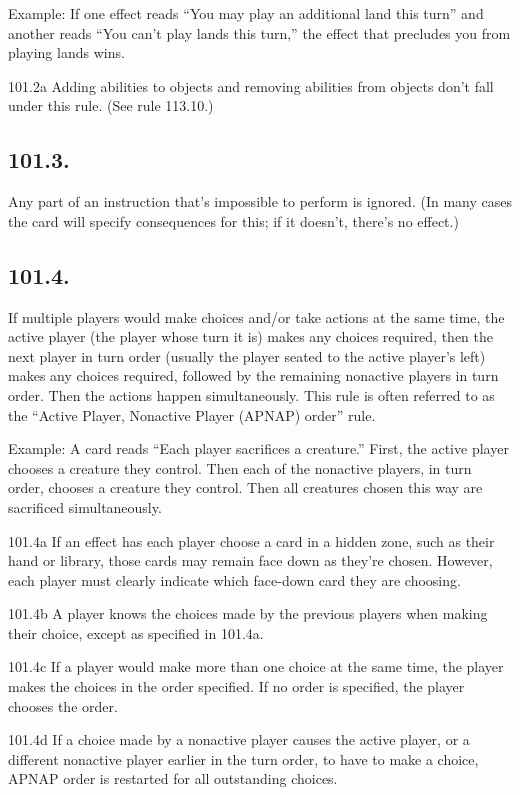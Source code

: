 Example: If one effect reads “You may play an additional land this turn” and another reads “You can’t play lands this turn,” the effect that precludes you from playing lands wins.

101.2a Adding abilities to objects and removing abilities from objects don’t fall under this rule. (See rule 113.10.)

\subsection*{101.3.}
Any part of an instruction that’s impossible to perform is ignored. (In many cases the card will specify consequences for this; if it doesn’t, there’s no effect.)

\subsection*{101.4.}
If multiple players would make choices and/or take actions at the same time, the active player (the player whose turn it is) makes any choices required, then the next player in turn order (usually the player seated to the active player’s left) makes any choices required, followed by the remaining nonactive players in turn order. Then the actions happen simultaneously. This rule is often referred to as the “Active Player, Nonactive Player (APNAP) order” rule.

Example: A card reads “Each player sacrifices a creature.” First, the active player chooses a creature they control. Then each of the nonactive players, in turn order, chooses a creature they control. Then all creatures chosen this way are sacrificed simultaneously.

101.4a If an effect has each player choose a card in a hidden zone, such as their hand or library, those cards may remain face down as they’re chosen. However, each player must clearly indicate which face-down card they are choosing.

101.4b A player knows the choices made by the previous players when making their choice, except as specified in 101.4a.

101.4c If a player would make more than one choice at the same time, the player makes the choices in the order specified. If no order is specified, the player chooses the order.

101.4d If a choice made by a nonactive player causes the active player, or a different nonactive player earlier in the turn order, to have to make a choice, APNAP order is restarted for all outstanding choices.

